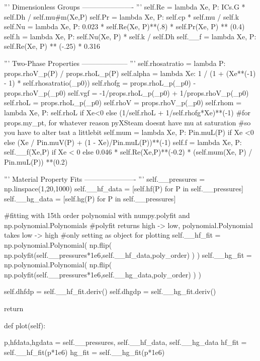 \documentclass{article}
\begin{document}
\begin{python}
        '''
        Dimensionless Groups
        ----------------------
        '''
        self.Re = lambda Xe, P: ICs.G * self.Dh / self.mu#m(Xe,P)
        self.Pr = lambda Xe, P: self.cp * self.mu / self.k
        self.Nu = lambda Xe, P: 0.023 * self.Re(Xe, P)**(.8) * self.Pr(Xe, P) ** (0.4)
        self.h = lambda Xe, P: self.Nu(Xe, P) * self.k / self.Dh 
        self.__f = lambda Xe, P: self.Re(Xe, P) ** (-.25) * 0.316

        '''
        Two-Phase Properties
        --------------------
        '''
        self.rhosatratio = lambda P: props.rhoV_p(P) / props.rhoL_p(P)
        self.alpha = lambda Xe: 1 / (1 + (Xe**(-1) - 1) * self.rhosatratio(_p0))
        self.rhofg = props.rhoL_p(_p0) - props.rhoV_p(_p0)
        self.vgf = -1/props.rhoL_p(_p0) + 1/props.rhoV_p(_p0)
        self.rhoL = props.rhoL_p(_p0)
        self.rhoV = props.rhoV_p(_p0)
        self.rhom = lambda Xe, P: self.rhoL if Xe<0 else (1/self.rhoL + 1/self.rhofg*Xe)**(-1)
            #for props.my_pt, for whatever reason pyXSteam doesnt have mu at saturation
            #so you have to alter tsat a littlebit
        self.mum = lambda Xe, P: Pin.muL(P) if Xe <0 else (Xe / Pin.muV(P) + (1 - Xe)/Pin.muL(P))**(-1)
        self.f = lambda Xe, P: self.__f(Xe,P) if Xe < 0 else 0.046 * self.Re(Xe,P)**(-0.2) * (self.mum(Xe, P) / Pin.muL(P)) **(0.2)


        '''
        Material Property Fits
        ----------------------
        '''
        self.__pressures = np.linspace(1,20,1000)
        self.__hf_data = [self.hf(P) for P in self.__pressures] 
        self.__hg_data = [self.hg(P) for P in self.__pressures]

        #fitting with 15th order polynomial with numpy.polyfit and np.polynomial.Polynomials
        #polyfit returns high -> low, polynomial.Polynomial takes low -> high 
        #only setting as object for plotting
        self.__hf_fit = np.polynomial.Polynomial( np.flip( np.polyfit(self.__pressures*1e6,self.__hf_data,poly_order) ) ) 
        self.__hg_fit = np.polynomial.Polynomial( np.flip( np.polyfit(self.__pressures*1e6,self.__hg_data,poly_order) ) ) 

        self.dhfdp = self.__hf_fit.deriv()
        self.dhgdp = self.__hg_fit.deriv()
        
        return

    def plot(self):
        
        p,hfdata,hgdata = self.__pressures, self.__hf_data, self.__hg_data
        hf_fit = self.__hf_fit(p*1e6)
        hg_fit = self.__hg_fit(p*1e6)


\end{python}
\end{document}
